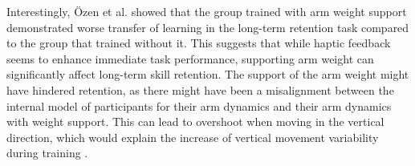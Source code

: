 Interestingly, Özen et al. showed that the group trained with arm weight support demonstrated worse transfer of learning in the long-term retention task compared to the group that trained without it. This suggests that while haptic feedback seems to enhance immediate task performance, supporting arm weight can significantly affect long-term skill retention. The support of the arm weight might have hindered retention, as there might have been a misalignment between the internal model of participants for their arm dynamics and their arm dynamics with weight support. This can lead to overshoot when moving in the vertical direction, which would explain the increase of vertical movement variability during training \cite{Oezen2022}. 




